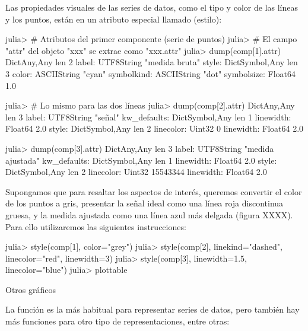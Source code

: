 ﻿\documentclass[spanish]{article}
\begin{document}
Las propiedades visuales de las series de datos, como el tipo y color de las
líneas y los puntos, están en un atributo especial llamado 
(estilo):

julia> # Atributos del primer componente (serie de puntos)
julia> # El campo "attr" del objeto "xxx" se extrae como "xxx.attr"
julia> dump(comp[1].attr)
Dict{Any,Any} len 2
  label: UTF8String "medida bruta"
  style: Dict{Symbol,Any} len 3
    color: ASCIIString "cyan"
    symbolkind: ASCIIString "dot"
    symbolsize: Float64 1.0

julia> # Lo mismo para las dos líneas
julia> dump(comp[2].attr)
Dict{Any,Any} len 3
  label: UTF8String "señal"
  kw_defaults: Dict{Symbol,Any} len 1
    linewidth: Float64 2.0
  style: Dict{Symbol,Any} len 2
    linecolor: Uint32 0
    linewidth: Float64 2.0

julia> dump(comp[3].attr)
Dict{Any,Any} len 3
  label: UTF8String "medida ajustada"
  kw_defaults: Dict{Symbol,Any} len 1
    linewidth: Float64 2.0
  style: Dict{Symbol,Any} len 2
    linecolor: Uint32 15543344
    linewidth: Float64 2.0

Supongamos que para resaltar los aspectos de interés,
queremos convertir el color de los puntos a gris, 
presentar la señal ideal como una línea roja discontinua gruesa,
y la medida ajustada como una línea azul más delgada (figura XXXX).
Para ello utilizaremos las siguientes instrucciones:

julia> style(comp[1], color="grey")
julia> style(comp[2], linekind="dashed", linecolor="red", linewidth=3)
julia> style(comp[3], linewidth=1.5, linecolor="blue")
julia> plottable

Otros gráficos

La función  es la más habitual para representar series de datos,
pero también hay más funciones para otro tipo de representaciones, entre otras:
\end{document}
